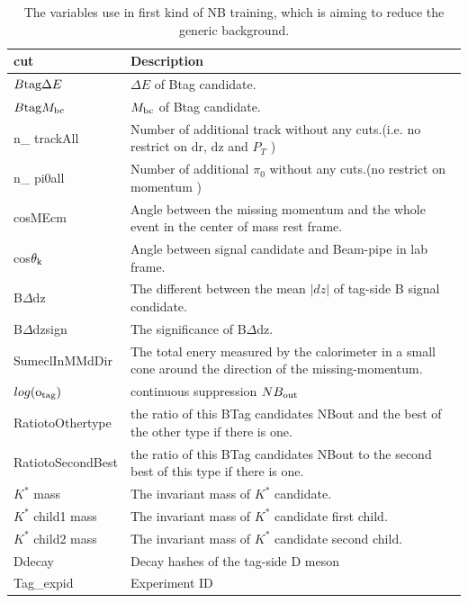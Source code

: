 \begin{table}[ht]
\small
\begin{center}
\begin{tabular}{ |p{3cm}||p{10cm}|  }
 \hline
 cut& Description \\
 \hline
 \hline
  $B{\rm{tag}}\Delta E$   &  $\Delta E$ of Btag candidate.    \\
 \hline
 $B{\rm{tag}}M_{\rm{bc}}$   &  $M_{\rm{bc}}$ of Btag candidate.   \\
 \hline
 n\_ trackAll    & Number of additional track without any cuts.(i.e. no restrict on dr, dz and $P_T$ )  \\
  \hline
 n\_ pi0all    & Number of additional $\pi_0$ without any cuts.(no restrict on momentum )  \\
 \hline
 cosMEcm & Angle between the missing momentum and the whole event in the center of mass rest frame.\\
 \hline
 cos$\theta_{\rm{k}}$& Angle between signal candidate and Beam-pipe in lab frame.\\
 \hline
B$\Delta$dz& The different between the mean $|dz|$ of tag-side B signal condidate.  \\
 \hline
B$\Delta$dzsign& The significance of B$\Delta$dz.\\
\hline
 SumeclInMMdDir& The total enery measured by the calorimeter in a small cone around the direction of the missing-momentum.\\
 \hline
  $log(\rm{o_{tag}})$ & continuous suppression $NB_{\rm{out}}$\\
 \hline
RatiotoOthertype & the ratio of this BTag candidates NBout and the best of the other type if there is one.\\
 \hline
RatiotoSecondBest & the ratio of this BTag candidates NBout to the second best of this type if there is one.\\
 \hline
  $K^*$ mass   &  The invariant mass of $K^{*}$ candidate.    \\
 \hline
  $K^*$ child1 mass   &  The invariant mass of $K^{*}$ candidate first child.    \\
 \hline
  $K^*$ child2 mass   &  The invariant mass of $K^{*}$ candidate second child.    \\
 \hline
  Ddecay   &  Decay hashes of the tag-side D meson    \\
 \hline
  Tag\_expid   &  Experiment ID    \\
 \hline
\end{tabular}

\caption{The variables use in first kind of NB training, which is aiming to reduce the generic background. } \label{t:nbvlike_variables}
\end{center}
\end{table}

